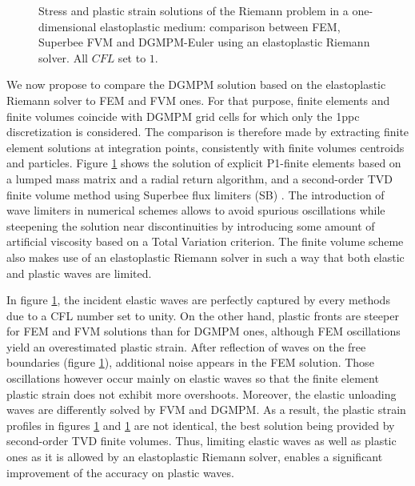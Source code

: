 \begin{figure}[h!]
  \centering
  { \label{subfig:ep_dgmpm_fvm1}}
  { \label{subfig:ep_dgmpm_fvm3}}
  {}
  \caption{Stress and plastic strain solutions of the Riemann problem in a one-dimensional elastoplastic medium: comparison between FEM, Superbee FVM and DGMPM-Euler using an elastoplastic Riemann solver. All $CFL$ set to $1$.}
  \label{fig:RP_EP_dgmpm_fvm}
\end{figure}


We now propose to compare the DGMPM solution based on the elastoplastic Riemann solver to FEM and FVM ones.
For that purpose, finite elements and finite volumes coincide with DGMPM grid cells for which only the 1ppc discretization is considered.
The comparison is therefore made by extracting finite element solutions at integration points, consistently with finite volumes centroids and particles.
Figure \ref{fig:RP_EP_dgmpm_fvm} shows the solution of explicit P1-finite elements based on a lumped mass matrix and a radial return algorithm, and a second-order TVD finite volume method using Superbee flux limiters (SB) \cite{Thomas_EP}.
The introduction of wave limiters in numerical schemes allows to avoid spurious oscillations while steepening the solution near discontinuities by introducing some amount of artificial viscosity based on a Total Variation criterion.
The finite volume scheme also makes use of an elastoplastic Riemann solver in such a way that both elastic and plastic waves are limited.

In figure \ref{fig:RP_EP_dgmpm_fvm}, the incident elastic waves are perfectly captured by every methods due to a CFL number set to unity.
On the other hand, plastic fronts are steeper for FEM and FVM solutions than for DGMPM ones, although FEM oscillations yield an overestimated plastic strain. 
After reflection of waves on the free boundaries (figure \ref{fig:RP_EP_dgmpm_fvm}), additional noise appears in the FEM solution.
Those oscillations however occur mainly on elastic waves so that the finite element plastic strain does not exhibit more overshoots.
Moreover, the elastic unloading waves are differently solved by FVM and DGMPM.
As a result, the plastic strain profiles in figures \ref{fig:RP_EP_dgmpm_fvm} and \ref{fig:RP_EP_dgmpm_fvm} are not identical, the best solution being provided by second-order TVD finite volumes. %
Thus, limiting elastic waves as well as plastic ones as it is allowed by an elastoplastic Riemann solver, enables a significant improvement of the accuracy on plastic waves.

